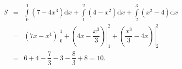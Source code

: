 \begin{ex}
{\begin{eqnarray*}
	 S&=&\displaystyle\int\limits_0^1\left(7-4 x^3\right) \mathrm{d}x+\displaystyle\int\limits_1^2\left(4-x^2\right) \mathrm{d}x+\displaystyle\int\limits_2^3\left(x^2-4\right) \mathrm{d}x \\ & =&\left.\left(7 x-x^4\right)\right|_0 ^1+\left.\left(4 x-\dfrac{x^3}{3}\right)\right|_1 ^2+\left.\left(\dfrac{x^3}{3}-4 x\right)\right|_2 ^3
	\\&=&6+4-\dfrac{7}{3}-3-\dfrac{8}{3}+8=10 .
\end{eqnarray*}
}
\end{ex}
